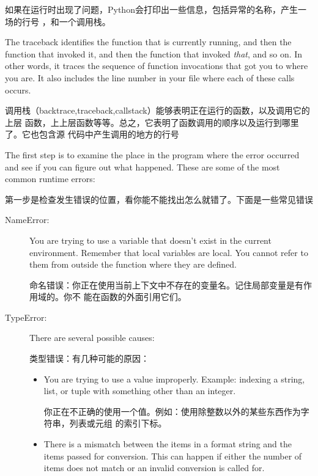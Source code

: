 \documentclass[10pt]{book}
\begin{document}
\begin{CJK}{UTF8}{gbsn}
如果在运行时出现了问题，Python会打印出一些信息，包括异常的名称，产生一场的行号
，和一个调用栈。

The traceback identifies the function that is currently running,
and then the function that invoked it, and then the function that
invoked {\em that}, and so on.  In other words, it traces the
sequence of function invocations that got you to where you are.  It
also includes the line number in your file where each of these
calls occurs.

调用栈（backtrace,traceback,callstack）能够表明正在运行的函数，以及调用它的上层
函数，上上层函数等等。总之，它表明了函数调用的顺序以及运行到哪里了。它也包含源
代码中产生调用的地方的行号

The first step is to examine the place in the program where
the error occurred and see if you can figure out what happened.
These are some of the most common runtime errors:

第一步是检查发生错误的位置，看你能不能找出怎么就错了。下面是一些常见错误

\begin{description}

\item[NameError:]  You are trying to use a variable that doesn't
exist in the current environment.
Remember that local variables are local.  You
cannot refer to them from outside the function where they are defined.

命名错误：你正在使用当前上下文中不存在的变量名。记住局部变量是有作用域的。你不
能在函数的外面引用它们。

\item[TypeError:] There are several possible causes:

    类型错误：有几种可能的原因：

\begin{itemize}

\item  You are trying to use a value improperly.  Example: indexing
a string, list, or tuple with something other than an integer.

你正在不正确的使用一个值。例如：使用除整数以外的某些东西作为字符串，列表或元组
的索引下标。

\item There is a mismatch between the items in a format string and
the items passed for conversion.  This can happen if either the number
of items does not match or an invalid conversion is called for.



\end{itemize}
\end{description}
\end{CJK}
\end{document}
